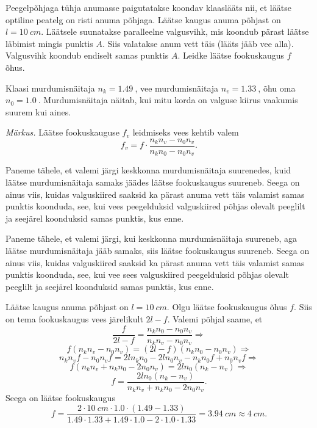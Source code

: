 
Peegelpõhjaga tühja anumasse paigutatakse koondav klaaslääts nii, et läätse optiline peatelg on risti anuma põhjaga. Läätse kaugus anuma põhjast on $l=\SI{10}{cm}$. Läätsele suunatakse paralleelne valgusvihk, mis koondub pärast läätse läbimist mingis punktis $A$. Siis valatakse anum vett täis (lääts jääb vee alla). Valgusvihk koondub endiselt samas punktis $A$. Leidke läätse fookuskaugus $f$ õhus.

Klaasi murdumisnäitaja $n_k = \SI{1,49}{}$, vee murdumisnäitaja $n_v = \SI{1,33}{}$, õhu oma $n_0 = \SI{1,0}{}$. Murdumisnäitaja näitab, kui mitu korda on valguse kiirus vaakumis suurem kui aines.

\emph{Märkus.} Läätse fookuskauguse $f_v$ leidmiseks vees kehtib valem 
\[ f_v = f\cdot\frac{n_k n_v - n_0 n_v}{n_k n_0 - n_0 n_v}. \]

\hint
Paneme tähele, et valemi järgi keskkonna murdumisnäitaja suurenedes, kuid läätse murdumisnäitaja samaks jäädes läätse fookuskaugus suureneb. Seega on ainus viis, kuidas valguskiired saaksid ka pärast anuma vett täis valamist samas punktis koonduda, see, kui vees peegelduksid valguskiired põhjas olevalt peeglilt ja seejärel koonduksid samas punktis, kus enne.

\solu
Paneme tähele, et valemi järgi, kui keskkonna murdumisnäitaja suureneb, aga läätse murdumisnäitaja jääb samaks, siis läätse fookuskaugus suureneb. Seega on ainus viis, kuidas valguskiired saaksid ka pärast anuma vett täis valamist samas punktis koonduda, see, kui vee sees valguskiired peegelduksid põhjas olevalt peeglilt ja seejärel koonduksid samas punktis, kus enne.

Läätse kaugus anuma põhjast on $l = \SI{10}{cm}$. Olgu läätse fookuskaugus õhus $f$. Siis on tema fookuskaugus vees järelikult $2l-f$. Valemi põhjal saame, et
\[ \frac{f}{2l-f} = \frac{n_k n_0 - n_0 n_v}{n_k n_v - n_0 n_v}\Rightarrow \]
\[ f(n_k n_v - n_0 n_v) = (2l-f)(n_k n_0 - n_0 n_v)\Rightarrow \]
\[ n_k n_v f - n_0 n_v f = 2l n_k n_0 - 2l n_0 n_v - n_k n_0 f + n_0 n_v f\Rightarrow \]
\[ f (n_k n_v + n_k n_0 - 2 n_0 n_v) = 2l n_0 (n_k - n_v)\Rightarrow \]
\[ f = \frac{2l n_0 (n_k - n_v)}{n_k n_v + n_k n_0 - 2 n_0 n_v}. \]
Seega on läätse fookuskaugus 
\[ f = \frac{\num{2} \cdot \SI{10}{cm} \cdot \num{1,0} \cdot (\num{1,49} - \num{1,33})}{\num{1,49}
\cdot \num{1,33} + \num{1,49} \cdot \num{1,0} - \num{2} \cdot \num{1,0} \cdot \num{1,33}} = \SI{3,94}{cm}
\approx \SI{4}{cm}. \]

